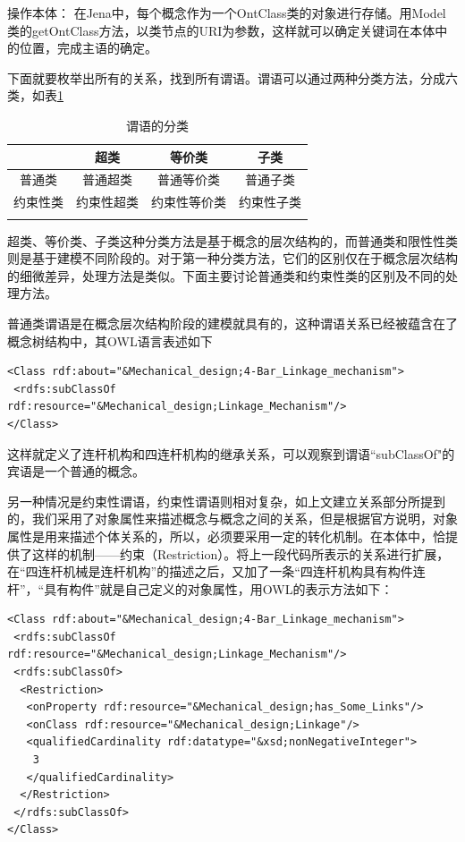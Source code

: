 \documentclass[12pt,a4paper]{article}
\begin{document}
	
	操作本体：		
	在Jena中，每个概念作为一个OntClass类的对象进行存储。用Model类的getOntClass方法，以类节点的URI为参数，这样就可以确定关键词在本体中的位置，完成主语的确定。
	
	下面就要枚举出所有的关系，找到所有谓语。谓语可以通过两种分类方法，分成六类，如表\ref{tb:谓语分类}

\begin{table}[htbp]
\centering
\caption{\label{tb:谓语分类}谓语的分类}
\begin{tabular}{c|c|c|c}
\Xhline{1.5pt}
 & 超类 & 等价类 & 子类\\
\hline
 普通类 & 普通超类 & 普通等价类 & 普通子类\\
\hline
 约束性类  & 约束性超类 & 约束性等价类 & 约束性子类\\
\Xhline{1.5pt}
\end{tabular}
\end{table}

	超类、等价类、子类这种分类方法是基于概念的层次结构的，而普通类和限性性类则是基于建模不同阶段的。对于第一种分类方法，它们的区别仅在于概念层次结构的细微差异，处理方法是类似。下面主要讨论普通类和约束性类的区别及不同的处理方法。
	
	普通类谓语是在概念层次结构阶段的建模就具有的，这种谓语关系已经被蕴含在了概念树结构中，其OWL语言表述如下
	
	\lstset{language=XML,frame=lines}
	\begin{lstlisting}
<Class rdf:about="&Mechanical_design;4-Bar_Linkage_mechanism">
 <rdfs:subClassOf rdf:resource="&Mechanical_design;Linkage_Mechanism"/>
</Class>
	\end{lstlisting}
	
	这样就定义了连杆机构和四连杆机构的继承关系，可以观察到谓语“subClassOf"的宾语是一个普通的概念。
	
	另一种情况是约束性谓语，约束性谓语则相对复杂，如上文建立关系部分所提到的，我们采用了对象属性来描述概念与概念之间的关系，但是根据官方说明，对象属性是用来描述个体关系的，所以，必须要采用一定的转化机制。在本体中，恰提供了这样的机制——约束（Restriction）。将上一段代码所表示的关系进行扩展，在“四连杆机械是连杆机构”的描述之后，又加了一条“四连杆机构具有构件连杆”，“具有构件”就是自己定义的对象属性，用OWL的表示方法如下：
	
	\begin{lstlisting}
<Class rdf:about="&Mechanical_design;4-Bar_Linkage_mechanism">
 <rdfs:subClassOf rdf:resource="&Mechanical_design;Linkage_Mechanism"/>
 <rdfs:subClassOf>
  <Restriction>
   <onProperty rdf:resource="&Mechanical_design;has_Some_Links"/>
   <onClass rdf:resource="&Mechanical_design;Linkage"/>
   <qualifiedCardinality rdf:datatype="&xsd;nonNegativeInteger">
    3
   </qualifiedCardinality>
  </Restriction>
 </rdfs:subClassOf>
</Class>
	\end{lstlisting}
	
\end{document}
